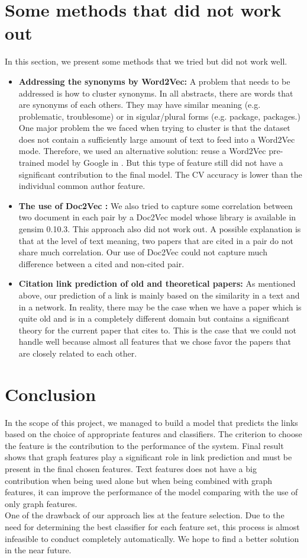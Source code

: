 \documentclass{article}
\begin{document}
\section{Some methods that did not work out}
\label{sec:notwork}
In this section, we present some methods that we tried but did not work well.
\begin{itemize}
\item \textbf{Addressing the synonyms by Word2Vec:} A problem that needs to be addressed is how to cluster synonyms. In all abstracts, there are words that are synonyms of each others. They may have similar meaning (e.g. problematic, troublesome) or in sigular/plural forms (e.g. package, packages.) One major problem the we faced when trying to cluster is that the dataset does not contain a sufficiently large amount of text to feed into a Word2Vec mode. Therefore, we used an alternative solution: reuse a Word2Vec pre-trained model by Google in \cite{word2vecgg}. But this type of feature still did not have a significant contribution to the final model. The CV accuracy is lower than the individual common author feature.
\item \textbf{The use of Doc2Vec \cite{DBLP:LeM14}:} We also tried to capture some correlation between two document in each pair by a Doc2Vec model whose library is available in gensim 0.10.3. This approach also did not work out. A possible explanation is that at the level of text meaning, two papers that are cited in a pair do not share much correlation. Our use of Doc2Vec could not capture much difference between a cited and non-cited pair.
\item \textbf{Citation link prediction of old and theoretical papers:} As mentioned above, our prediction of a link is mainly based on the similarity in a text and in a network. In reality, there may be the case when we have a paper which is quite old and is in a completely different domain but contains a significant theory for the current paper that cites to. This is the case that we could not handle well because almost all features that we chose favor the papers that are closely related to each other.
\end{itemize}

\section{Conclusion}
\label{sec:conclusion}
In the scope of this project, we managed to build a model that predicts the links based on the choice of appropriate features and classifiers. The criterion to choose the feature is the contribution to the performance of the system. Final result shows that graph features play a significant role in link prediction and must be present in the final chosen features. Text features does not have a big contribution when being used alone but when being combined with graph features, it can improve the performance of the model comparing with the use of only graph features.\\
One of the drawback of our approach lies at the feature selection. Due to the need for determining the best classifier for each feature set, this process is almost infeasible to conduct completely automatically. We hope to find a better solution in the near future.
\end{document}
